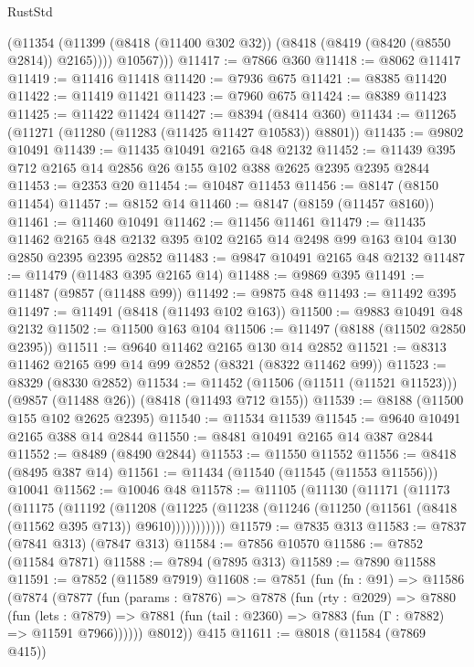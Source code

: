 \begin{lexlean}{RustStd}
\begin{coremodule}
          (@11354 (@11399 (@8418 (@11400 @302 @32)) (@8418 (@8419 (@8420 (@8550 @2814)) @2165))))
          @10567)))
@11417 := @7866 @360
@11418 := @8062 @11417
@11419 := @11416 @11418
@11420 := @7936 @675
@11421 := @8385 @11420
@11422 := @11419 @11421
@11423 := @7960 @675
@11424 := @8389 @11423
@11425 := @11422 @11424
@11427 := @8394 (@8414 @360)
@11434 := @11265 (@11271 (@11280 (@11283 (@11425 @11427 @10583)) @8801))
@11435 := @9802 @10491
@11439 := @11435 @10491 @2165 @48 @2132
@11452 := @11439 @395 @712 @2165 @14 @2856 @26 @155 @102 @388 @2625 @2395 @2395 @2844
@11453 := @2353 @20
@11454 := @10487 @11453
@11456 := @8147 (@8150 @11454)
@11457 := @8152 @14
@11460 := @8147 (@8159 (@11457 @8160))
@11461 := @11460 @10491
@11462 := @11456 @11461
@11479 := @11435
    @11462
    @2165
    @48
    @2132
    @395
    @102
    @2165
    @14
    @2498
    @99
    @163
    @104
    @130
    @2850
    @2395
    @2395
    @2852
@11483 := @9847 @10491 @2165 @48 @2132
@11487 := @11479 (@11483 @395 @2165 @14)
@11488 := @9869 @395
@11491 := @11487 (@9857 (@11488 @99))
@11492 := @9875 @48
@11493 := @11492 @395
@11497 := @11491 (@8418 (@11493 @102 @163))
@11500 := @9883 @10491 @48 @2132
@11502 := @11500 @163 @104
@11506 := @11497 (@8188 (@11502 @2850 @2395))
@11511 := @9640 @11462 @2165 @130 @14 @2852
@11521 := @8313 @11462 @2165 @99 @14 @99 @2852 (@8321 (@8322 @11462 @99))
@11523 := @8329 (@8330 @2852)
@11534 := @11452 (@11506 (@11511 (@11521 @11523))) (@9857 (@11488 @26)) (@8418 (@11493 @712 @155))
@11539 := @8188 (@11500 @155 @102 @2625 @2395)
@11540 := @11534 @11539
@11545 := @9640 @10491 @2165 @388 @14 @2844
@11550 := @8481 @10491 @2165 @14 @387 @2844
@11552 := @8489 (@8490 @2844)
@11553 := @11550 @11552
@11556 := @8418 (@8495 @387 @14)
@11561 := @11434 (@11540 (@11545 (@11553 @11556))) @10041
@11562 := @10046 @48
@11578 := @11105
    (@11130
      (@11171
        (@11173
          (@11175
            (@11192
              (@11208
                (@11225 (@11238 (@11246 (@11250 (@11561 (@8418 (@11562 @395 @713)) @9610)))))))))))
@11579 := @7835 @313
@11583 := @7837 (@7841 @313) (@7847 @313)
@11584 := @7856 @10570
@11586 := @7852 (@11584 @7871)
@11588 := @7894 (@7895 @313)
@11589 := @7890 @11588
@11591 := @7852 (@11589 @7919)
@11608 := @7851
    (fun (fn : @91) =>
    @11586
      (@7874
        (@7877
          (fun (params : @7876) =>
          @7878
            (fun (rty : @2029) =>
            @7880
              (fun (lets : @7879) =>
              @7881 (fun (tail : @2360) => @7883 (fun (Γ : @7882) => @11591 @7966))))))
        @8012))
    @415
@11611 := @8018 (@11584 (@7869 @415))

\end{coremodule}
\end{lexlean}
